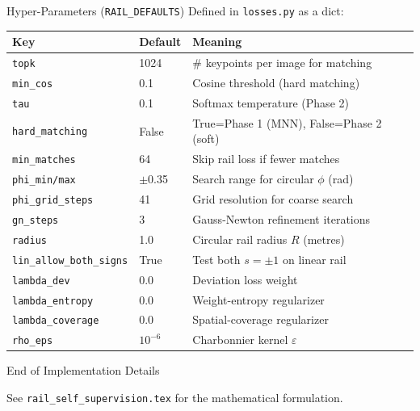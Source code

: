 \documentclass[aspectratio=169, 12pt]{beamer}
\begin{document}
\begin{frame}{Hyper-Parameters (\texttt{RAIL\_DEFAULTS})}
\small
Defined in \texttt{losses.py} as a dict:
\begin{center}
\begin{tabular}{llp{5.5cm}}
\toprule
\textbf{Key} & \textbf{Default} & \textbf{Meaning} \\
\midrule
\texttt{topk}           & 1024  & \# keypoints per image for matching \\
\texttt{min\_cos}       & 0.1   & Cosine threshold (hard matching) \\
\texttt{tau}            & 0.1   & Softmax temperature (Phase 2) \\
\texttt{hard\_matching} & False & True=Phase 1 (MNN), False=Phase 2 (soft) \\
\texttt{min\_matches}   & 64    & Skip rail loss if fewer matches \\
\texttt{phi\_min/max}   & $\pm$0.35 & Search range for circular $\phi$ (rad) \\
\texttt{phi\_grid\_steps} & 41  & Grid resolution for coarse search \\
\texttt{gn\_steps}      & 3     & Gauss-Newton refinement iterations \\
\texttt{radius}         & 1.0   & Circular rail radius $R$ (metres) \\
\texttt{lin\_allow\_both\_signs} & True & Test both $s=\pm 1$ on linear rail \\
\texttt{lambda\_dev}    & 0.0   & Deviation loss weight \\
\texttt{lambda\_entropy} & 0.0  & Weight-entropy regularizer \\
\texttt{lambda\_coverage} & 0.0 & Spatial-coverage regularizer \\
\texttt{rho\_eps}       & $10^{-6}$ & Charbonnier kernel $\varepsilon$ \\
\bottomrule
\end{tabular}
\end{center}
\end{frame}


\begin{frame}{}
\begin{center}
    {\Huge End of Implementation Details}

    \vspace{1em}
    {\large See \texttt{rail\_self\_supervision.tex} for the mathematical formulation.}
\end{center}
\end{frame}
\end{document}
